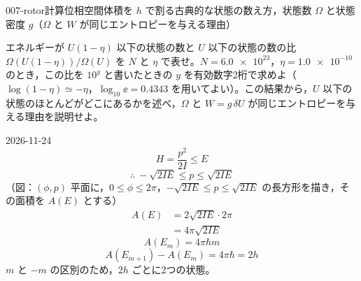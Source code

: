 \documentclass[uplatex,dvipdfmx,a4paper,11pt]{jsarticle}
\begin{document}
\begin{mondai}{007-rotor}{計算}{位相空間体積を $h$ で割る古典的な状態の数え方，状態数 $\Omega$ と状態密度 $g$（$\Omega$ と $W$ が同じエントロピーを与える理由）}
\begin{shoumon}
  \item エネルギーが $U(1-\eta)$ 以下の状態の数と $U$ 以下の状態の数の比 $\Omega(U(1-\eta))/\Omega(U)$ を $N$ と $\eta$ で表せ。$N=\num{6.0e23}$，$\eta=\num{1.0e-10}$ のとき，この比を $10^{y}$ と書いたときの $y$ を有効数字2桁で求めよ（$\log(1-\eta)\simeq-\eta$，$\log_{10}\ee=\num{0.4343}$ を用いてよい）。この結果から，$U$ 以下の状態のほとんどがどこにあるかを述べ，$\Omega$ と $W=g\,\delta U$ が同じエントロピーを与える理由を説明せよ。
\end{shoumon}
\begin{kotaeutsushi}{2026-11-24}
\[ H=\frac{p^{2}}{2I}\le E \]
\[ \therefore\ -\sqrt{2IE}\le p\le\sqrt{2IE} \]
（図：$(\phi,p)$ 平面に，$0\le\phi\le2\pi$，$-\sqrt{2IE}\le p\le\sqrt{2IE}$ の長方形を描き，その面積を $A(E)$ とする）
\begin{align*}
A(E)&=2\sqrt{2IE}\cdot2\pi\\
&=4\pi\sqrt{2IE}
\end{align*}
\[ A(E_{m})=4\pi\hbar m \]
\[ A(E_{m+1})-A(E_{m})=4\pi\hbar=2h \]
$m$ と $-m$ の区別のため，$2h$ ごとに2つの状態。


\end{kotaeutsushi}
\end{mondai}
\end{document}
